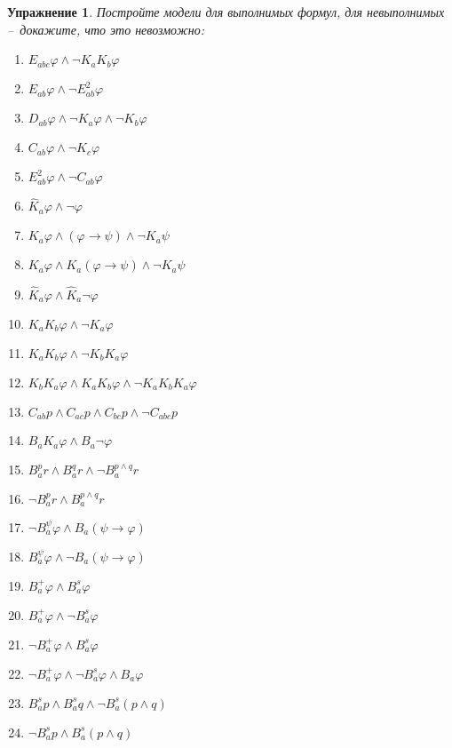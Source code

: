 \documentclass[11pt]{article}
\newtheorem{exercise}[theorem]{Упражнение}
\begin{document}
\begin{exercise}
Постройте модели для выполнимых формул, для невыполнимых – докажите, что это невозможно:
\begin{multicols}{2}
\begin{enumerate}
\item $E_{abc} \varphi \wedge \neg K_aK_b \varphi$
\item $E_{ab} \varphi \wedge \neg E^2_{ab} \varphi $
\item $D_{ab} \varphi \wedge \neg K_a \varphi  \wedge \neg K_b \varphi $ 
\item $C_{ab} \varphi \wedge \neg K_c \varphi$ 
\item $E^{2}_{ab}\varphi \wedge \neg C_{ab} \varphi$
\item  $ \hat{K}_a \varphi  \wedge \neg \varphi $
\item $K_a \varphi  \wedge  ( \varphi \to \psi)  \wedge \neg K_a \psi $
\item $K_a \varphi  \wedge  K_a ( \varphi \to \psi)  \wedge \neg K_a\psi $ 
\item $ \hat{K}_a \varphi  \wedge \hat{K}_a \neg \varphi  $
\item $ K_a K_b \varphi \wedge \neg K_a \varphi$
\item $ K_a K_b \varphi  \wedge \neg  K_b K_a \varphi  $
\item $ K_b K_a \varphi  \wedge K_a K_b \varphi \wedge   \neg K_a K_b  K_a \varphi  $ 
\item $C_{ab} p \wedge  C_{ac}  p \wedge C_{bc}  p \wedge \neg C_{abc} p$
\item $B_a K_a \varphi \wedge B_a \neg \varphi $
\item $B^p_a r \wedge B^q_a r \wedge \neg B^{p \wedge q}_a r $
\item $\neg B^p_a r  \wedge B^{p \wedge q}_a r $
\item $\neg B^{\psi}_{a}\varphi \wedge  B_{a} (\psi \to \varphi)$
\item $B^{\psi}_{a}\varphi \wedge  \neg B_{a} (\psi \to \varphi)$
\item $B^{+}_a \varphi \wedge B^{s}_a \varphi$
\item $B^{+}_a \varphi \wedge \neg B^{s}_a \varphi$
\item $\neg  B^{+}_a \varphi \wedge B^{s}_a \varphi$
\item $\neg  B^{+}_a \varphi \wedge \neg  B^{s}_a \varphi \wedge B_a \varphi$
\item $B^s_a p \wedge B^s_a q \wedge \neg B^s_a (p \wedge q)$
\item $\neg B^s_a p \wedge B^s_a (p \wedge q)$
\end{enumerate}
\end{multicols}
\end{exercise}
\end{document}
